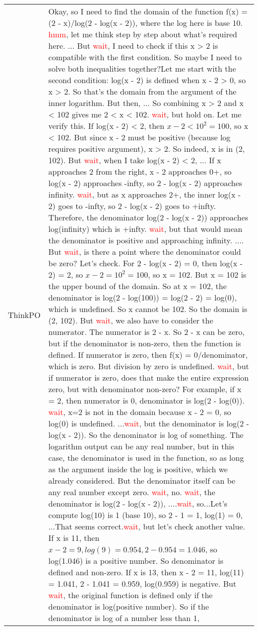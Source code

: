 \begin{table*}[ht]
{\begin{tabular}{p{0.5in}|p{5.5in}}
        \midrule
        \centering ThinkPO & Okay, so I need to find the domain of the function f(x) = (2 - x)/log(2 - log(x - 2)), where the log here is base 10. \textcolor{red}{hmm}, let me think step by step about what's required here.  ... But \textcolor{red}{wait}, I need to check if this x > 2 is compatible with the first condition. So maybe I need to solve both inequalities together?Let me start with the second condition: log(x - 2) is defined when x - 2 > 0, so x > 2. So that's the domain from the argument of the inner logarithm. But then, ... So combining x > 2 and x < 102 gives me 2 < x < 102. \textcolor{red}{wait}, but hold on. Let me verify this. If log(x - 2) < 2, then $x - 2 < 10^2 = 100$, so x < 102. But since x - 2 must be positive (because log requires positive argument), x > 2. So indeed, x is in (2, 102). But \textcolor{red}{wait}, when I take log(x - 2) < 2, ... If x approaches 2 from the right, x - 2 approaches 0+, so log(x - 2) approaches -infty, so 2 - log(x - 2) approaches infinity. \textcolor{red}{wait}, but as x approaches 2+, the inner log(x - 2) goes to -infty, so 2 - log(x - 2) goes to +infty. Therefore, the denominator log(2 - log(x - 2)) approaches log(infinity) which is +infty. \textcolor{red}{wait}, but that would mean the denominator is positive and approaching infinity. .... But \textcolor{red}{wait}, is there a point where the denominator could be zero? Let's check. For 2 - log(x - 2) = 0, then log(x - 2) = 2, so $x - 2 = 10^2 = 100$, so x = 102. But x = 102 is the upper bound of the domain. So at x = 102, the denominator is log(2 - log(100)) = log(2 - 2) = log(0), which is undefined. So x cannot be 102. So the domain is (2, 102). But \textcolor{red}{wait}, we also have to consider the numerator. The numerator is 2 - x. So 2 - x can be zero, but if the denominator is non-zero, then the function is defined. If numerator is zero, then f(x) = 0/denominator, which is zero. But division by zero is undefined. \textcolor{red}{wait}, but if numerator is zero, does that make the entire expression zero, but with denominator non-zero? For example, if x = 2, then numerator is 0, denominator is log(2 - log(0)). \textcolor{red}{wait}, x=2 is not in the domain because x - 2 = 0, so log(0) is undefined. ...\textcolor{red}{wait}, but the denominator is log(2 - log(x - 2)). So the denominator is log of something. The logarithm output can be any real number, but in this case, the denominator is used in the function, so as long as the argument inside the log is positive, which we already considered. But the denominator itself can be any real number except zero. \textcolor{red}{wait}, no. \textcolor{red}{wait}, the denominator is log(2 - log(x - 2)), ....\textcolor{red}{wait}, so...Let's compute log(10) is 1 (base 10), so 2 - 1 = 1, log(1) = 0, ...That seems correct.\textcolor{red}{wait}, but let's check another value. If x is 11, then $x - 2 = 9, log(9) = 0.954, 2 - 0.954 = 1.046$, so log(1.046) is a positive number. So denominator is defined and non-zero. If x is 13, then x - 2 = 11, log(11) = 1.041, 2 - 1.041 = 0.959, log(0.959) is negative. But \textcolor{red}{wait}, the original function is defined only if the denominator is log(positive number). So if the denominator is log of a number less than 1, 
\end{tabular}}
\end{table*}
